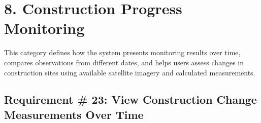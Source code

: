 \documentclass[12pt,a4paper]{report}
\begin{document}
\section{8. Construction Progress
Monitoring}\label{construction-progress-monitoring}

This category defines how the system presents monitoring results over
time, compares observations from different dates, and helps users assess
changes in construction sites using available satellite imagery and
calculated measurements.

\subsection{Requirement \# 23: View Construction Change Measurements
Over
Time}\label{requirement-26-view-construction-change-measurements-over-time}
\end{document}
